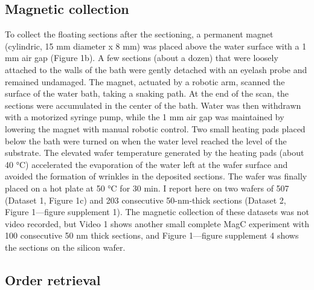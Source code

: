 \documentclass{article}
\begin{document}
\subsection*{Magnetic collection}

To collect the floating sections after the sectioning, a permanent magnet (cylindric, 15 mm diameter x 8 mm) was placed above the water surface with a 1 mm air gap (Figure 1b). A few sections (about a dozen) that were loosely attached to the walls of the bath were gently detached with an eyelash probe and remained undamaged. The magnet, actuated by a robotic arm, scanned the surface of the water bath, taking a snaking path. At the end of the scan, the sections were accumulated in the center of the bath. Water was then withdrawn with a motorized syringe pump, while the 1 mm air gap was maintained by lowering the magnet with manual robotic control. Two small heating pads placed below the bath were turned on when the water level reached the level of the substrate. The elevated wafer temperature generated by the heating pads (about 40 °C) accelerated the evaporation of the water left at the wafer surface and avoided the formation of wrinkles in the deposited sections. The wafer was finally placed on a hot plate at 50 °C for 30 min. I report here on two wafers of 507 (Dataset 1, Figure 1c) and 203 consecutive 50-nm-thick sections (Dataset 2, Figure 1---figure supplement 1). The magnetic collection of these datasets was not video recorded, but Video 1 shows another small complete MagC experiment with 100 consecutive 50 nm thick sections, and Figure 1---figure supplement 4 shows the sections on the silicon wafer.

\subsection*{Order retrieval}
\end{document}
